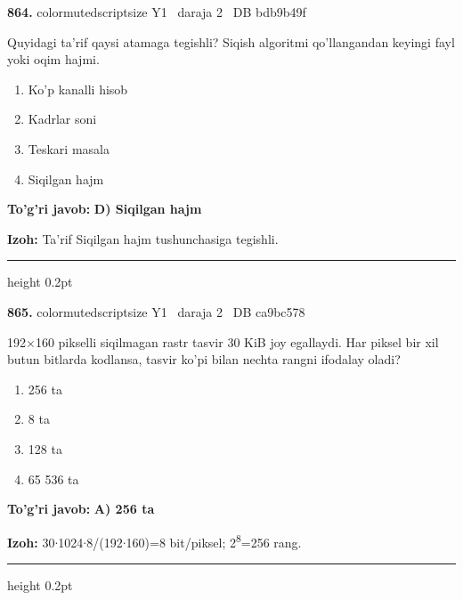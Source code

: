 \documentclass[10pt,a4paper,oneside]{article}
\begin{document}
\noindent\textbf{\color{ink}864.}  {color{muted}scriptsize Y1 \textbullet\ daraja 2 \textbullet\ DB bdb9b49f}
\par
Quyidagi ta'rif qaysi atamaga tegishli? Siqish algoritmi qo'llangandan keyingi fayl yoki oqim hajmi.
\begin{enumerate}[label=\Alph*),leftmargin=9mm]
\item Ko'p kanalli hisob
\item Kadrlar soni
\item Teskari masala
\item Siqilgan hajm
\end{enumerate}
\begin{tcolorbox}[enhanced,breakable,colback=teal!4,colframe=teal!50!black,boxrule=0.5pt,arc=1.1mm,left=3mm,right=3mm,top=1.7mm,bottom=1.7mm,before skip=2mm,after skip=2mm]
\textbf{\color{teal}To'g'ri javob:} \textbf{D) Siqilgan hajm}
\par\smallskip
\textbf{Izoh:} Ta'rif Siqilgan hajm tushunchasiga tegishli.
\end{tcolorbox}
\vspace{2mm}\hrule height 0.2pt \vspace{3mm}

\noindent\textbf{\color{ink}865.}  {color{muted}scriptsize Y1 \textbullet\ daraja 2 \textbullet\ DB ca9bc578}
\par
192\ensuremath{\times}160 pikselli siqilmagan rastr tasvir 30 KiB joy egallaydi. Har piksel bir xil butun bitlarda kodlansa, tasvir ko'pi bilan nechta rangni ifodalay oladi?
\begin{enumerate}[label=\Alph*),leftmargin=9mm]
\item 256 ta
\item 8 ta
\item 128 ta
\item 65 536 ta
\end{enumerate}
\begin{tcolorbox}[enhanced,breakable,colback=teal!4,colframe=teal!50!black,boxrule=0.5pt,arc=1.1mm,left=3mm,right=3mm,top=1.7mm,bottom=1.7mm,before skip=2mm,after skip=2mm]
\textbf{\color{teal}To'g'ri javob:} \textbf{A) 256 ta}
\par\smallskip
\textbf{Izoh:} 30\ensuremath{\cdot}1024\ensuremath{\cdot}8/(192\ensuremath{\cdot}160)=8 bit/piksel; 2\textsuperscript{8}=256 rang.
\end{tcolorbox}
\vspace{2mm}\hrule height 0.2pt \vspace{3mm}
\end{document}

